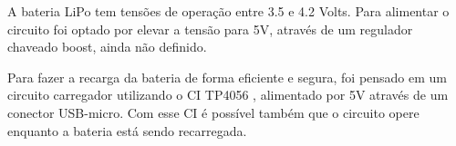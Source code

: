 \documentclass[../monografia.tex]{subfiles}
\begin{document}
A bateria LiPo tem tensões de operação entre 3.5 e 4.2 Volts. Para alimentar o circuito foi optado por elevar a tensão para 5V, através de um regulador chaveado boost, ainda não definido. 

Para fazer a recarga da bateria de forma eficiente e segura, foi pensado em um circuito carregador utilizando o CI TP4056 \cite{tp4056}, alimentado por 5V através de um conector USB-micro. Com esse CI é possível também que o circuito opere enquanto a bateria está sendo recarregada. 
\end{document}
